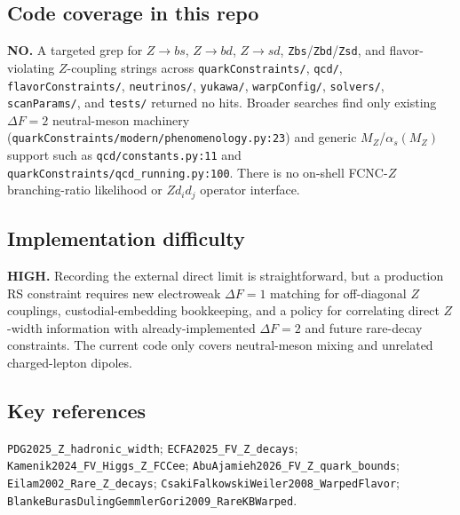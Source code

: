 \subsection*{Code coverage in this repo}
\textbf{NO.}  A targeted grep for \(Z\to bs\), \(Z\to bd\), \(Z\to sd\),
\texttt{Zbs}/\texttt{Zbd}/\texttt{Zsd}, and flavor-violating \(Z\)-coupling
strings across \texttt{quarkConstraints/}, \texttt{qcd/},
\texttt{flavorConstraints/}, \texttt{neutrinos/}, \texttt{yukawa/},
\texttt{warpConfig/}, \texttt{solvers/}, \texttt{scanParams/}, and
\texttt{tests/} returned no hits.  Broader searches find only existing
\(\Delta F=2\) neutral-meson machinery
(\texttt{quarkConstraints/modern/phenomenology.py:23}) and generic
\(M_Z\)/\(\alpha_s(M_Z)\) support such as
\texttt{qcd/constants.py:11} and \texttt{quarkConstraints/qcd\_running.py:100}.
There is no on-shell FCNC-\(Z\) branching-ratio likelihood or \(Z d_i d_j\)
operator interface.

\subsection*{Implementation difficulty}
\textbf{HIGH.}  Recording the external direct limit is straightforward, but a
production RS constraint requires new electroweak \(\Delta F=1\) matching for
off-diagonal \(Z\) couplings, custodial-embedding bookkeeping, and a policy for
correlating direct \(Z\)-width information with already-implemented
\(\Delta F=2\) and future rare-decay constraints.  The current code only
covers neutral-meson mixing and unrelated charged-lepton dipoles.

\subsection*{Key references}
\texttt{PDG2025\_Z\_hadronic\_width};
\texttt{ECFA2025\_FV\_Z\_decays};
\texttt{Kamenik2024\_FV\_Higgs\_Z\_FCCee};
\texttt{AbuAjamieh2026\_FV\_Z\_quark\_bounds};
\texttt{Eilam2002\_Rare\_Z\_decays};
\texttt{CsakiFalkowskiWeiler2008\_WarpedFlavor};
\texttt{BlankeBurasDulingGemmlerGori2009\_RareKBWarped}.
